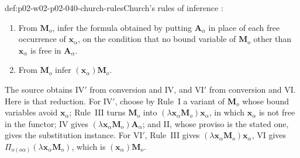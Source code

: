 \begin{hbdefinition}{def:p02-w02-p02-040-church-rules}{Church's rules of inference}
\cite[\S3, p.~60]{Church1940}:
\begin{enumerate}
 \item[IV\('\).] From \(\mathbf M_o\), infer the formula obtained by putting
   \(\mathbf A_\alpha\) in place of each free occurrence of
   \(\mathbf x_\alpha\), on the condition that no bound variable of
   \(\mathbf M_o\) other than \(\mathbf x_\alpha\) is free in
   \(\mathbf A_\alpha\).
 \item[VI\('\).] From \(\mathbf M_o\) infer \((\mathbf x_\alpha)\mathbf M_o\).
\end{enumerate}
The source obtains IV\('\) from conversion and IV, and VI\('\) from
conversion and VI.  Here is that reduction.  For IV\('\), choose by Rule~I a
variant of \(\mathbf M_o\) whose bound variables avoid \(\mathbf x_\alpha\);
Rule~III turns \(\mathbf M_o\) into
\((\lambda\mathbf x_\alpha\mathbf M_o)\mathbf x_\alpha\), in which
\(\mathbf x_\alpha\) is not free in the functor; IV gives
\((\lambda\mathbf x_\alpha\mathbf M_o)\mathbf A_\alpha\); and II, whose
proviso is the stated one, gives the substitution instance.  For VI\('\),
Rule~III gives \((\lambda\mathbf x_\alpha\mathbf M_o)\mathbf x_\alpha\), VI
gives \(\Pi_{o(o\alpha)}(\lambda\mathbf x_\alpha\mathbf M_o)\), which is
\((\mathbf x_\alpha)\mathbf M_o\).
\end{hbdefinition}

